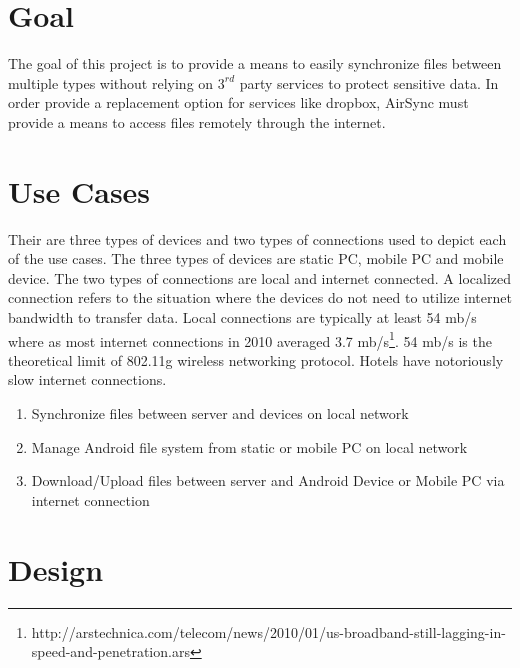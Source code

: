\documentclass[12pt]{article}
\begin{document}
\section{Goal}

The goal of this project is to provide a means to easily synchronize files between multiple types without relying on $3^{rd}$ party services to protect sensitive data. In order provide a replacement option for services like dropbox, AirSync must provide a means to access files remotely through the internet.

\section {Use Cases}

Their are three types of devices and two types of connections used to depict each of the use cases.  The three types of devices are static PC, mobile PC and mobile device.  The two types of connections are local and internet connected. A localized connection refers to the situation where the devices do not need to utilize internet bandwidth to transfer data.  Local connections are typically at least 54 mb/s where as most internet connections in 2010 averaged 3.7 mb/s\footnote{http://arstechnica.com/telecom/news/2010/01/us-broadband-still-lagging-in-speed-and-penetration.ars}. 54 mb/s is the theoretical limit of 802.11g wireless networking protocol. Hotels have notoriously slow internet connections.

\begin{enumerate}
\item Synchronize files between server and devices on local network
\item Manage Android file system from static or mobile PC on local network
\item Download/Upload files between server and Android Device or Mobile PC via internet connection
\end{enumerate}

\section{Design}
\end{document}

